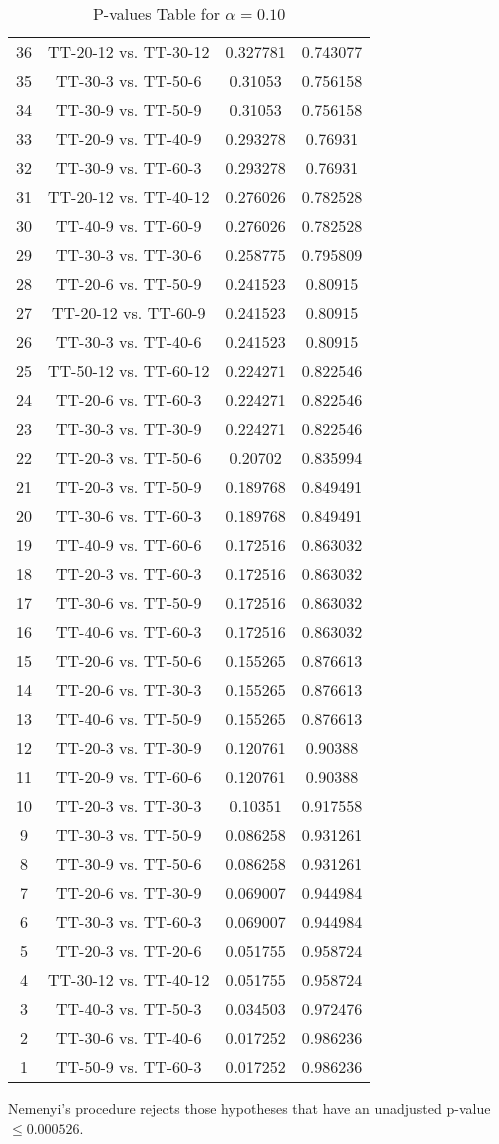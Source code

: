\documentclass[a4paper,10pt]{article}
\begin{document}
\begin{landscape}
\begin{table}[!htp]
\begin{tabular}{cccc}
36&TT-20-12 vs. TT-30-12&0.327781&0.743077\\
35&TT-30-3 vs. TT-50-6&0.31053&0.756158\\
34&TT-30-9 vs. TT-50-9&0.31053&0.756158\\
33&TT-20-9 vs. TT-40-9&0.293278&0.76931\\
32&TT-30-9 vs. TT-60-3&0.293278&0.76931\\
31&TT-20-12 vs. TT-40-12&0.276026&0.782528\\
30&TT-40-9 vs. TT-60-9&0.276026&0.782528\\
29&TT-30-3 vs. TT-30-6&0.258775&0.795809\\
28&TT-20-6 vs. TT-50-9&0.241523&0.80915\\
27&TT-20-12 vs. TT-60-9&0.241523&0.80915\\
26&TT-30-3 vs. TT-40-6&0.241523&0.80915\\
25&TT-50-12 vs. TT-60-12&0.224271&0.822546\\
24&TT-20-6 vs. TT-60-3&0.224271&0.822546\\
23&TT-30-3 vs. TT-30-9&0.224271&0.822546\\
22&TT-20-3 vs. TT-50-6&0.20702&0.835994\\
21&TT-20-3 vs. TT-50-9&0.189768&0.849491\\
20&TT-30-6 vs. TT-60-3&0.189768&0.849491\\
19&TT-40-9 vs. TT-60-6&0.172516&0.863032\\
18&TT-20-3 vs. TT-60-3&0.172516&0.863032\\
17&TT-30-6 vs. TT-50-9&0.172516&0.863032\\
16&TT-40-6 vs. TT-60-3&0.172516&0.863032\\
15&TT-20-6 vs. TT-50-6&0.155265&0.876613\\
14&TT-20-6 vs. TT-30-3&0.155265&0.876613\\
13&TT-40-6 vs. TT-50-9&0.155265&0.876613\\
12&TT-20-3 vs. TT-30-9&0.120761&0.90388\\
11&TT-20-9 vs. TT-60-6&0.120761&0.90388\\
10&TT-20-3 vs. TT-30-3&0.10351&0.917558\\
9&TT-30-3 vs. TT-50-9&0.086258&0.931261\\
8&TT-30-9 vs. TT-50-6&0.086258&0.931261\\
7&TT-20-6 vs. TT-30-9&0.069007&0.944984\\
6&TT-30-3 vs. TT-60-3&0.069007&0.944984\\
5&TT-20-3 vs. TT-20-6&0.051755&0.958724\\
4&TT-30-12 vs. TT-40-12&0.051755&0.958724\\
3&TT-40-3 vs. TT-50-3&0.034503&0.972476\\
2&TT-30-6 vs. TT-40-6&0.017252&0.986236\\
1&TT-50-9 vs. TT-60-3&0.017252&0.986236\\
\hline
\end{tabular}
\caption{P-values Table for $\alpha=0.10$}
\end{table}Nemenyi's procedure rejects those hypotheses that have an unadjusted p-value $\le0.000526$.


\end{landscape}
\end{document}
